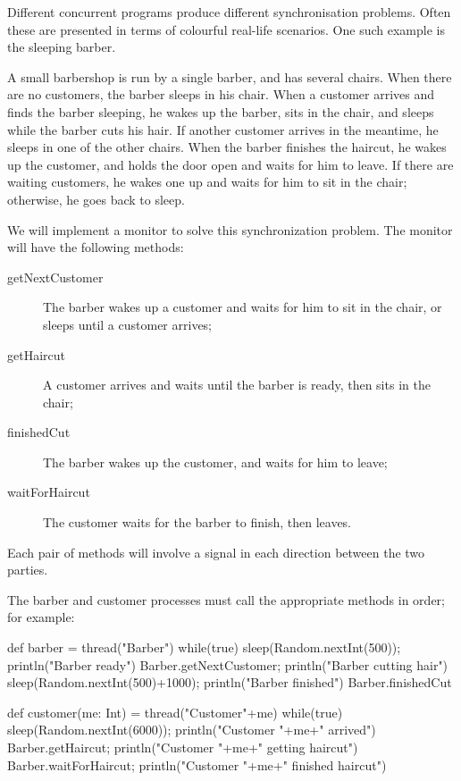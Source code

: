
\begin{slide}

Different concurrent programs produce different synchronisation problems.
Often these are presented in terms of colourful real-life scenarios.  One such
example is the sleeping barber.

A small barbershop is run by a single barber, and has several chairs.  When
there are no customers, the barber sleeps in his chair.  When a customer
arrives and finds the barber sleeping, he wakes up the barber, sits in the
chair, and sleeps while the barber cuts his hair.  If another customer arrives
in the meantime, he sleeps in one of the other chairs.  When the barber
finishes the haircut, he wakes up the customer, and holds the door open and
waits for him to leave.  If there are waiting customers, he wakes one up and
waits for him to sit in the chair; otherwise, he goes back to sleep.
\end{slide}


\begin{slide}

We will implement a monitor to solve this synchronization problem.  The
monitor will have the following methods:
%
\begin{description}
\item[getNextCustomer]
The barber wakes up a customer and waits for him to sit in the chair, or
sleeps until a customer arrives;

\item[getHaircut]
A customer arrives and waits until the barber is ready, then sits in the
chair;

\item[finishedCut]
The barber wakes up the customer, and waits for him to leave;

\item[waitForHaircut]
The customer waits for the barber to finish, then leaves.
\end{description}
%
Each pair of methods will involve a signal in each direction between the two
parties.
\end{slide}

\begin{slide}

The barber and customer processes must call the appropriate methods in order;
for example:
%
\begin{scala}
  def barber = thread("Barber"){
    while(true){
      sleep(Random.nextInt(500)); println("Barber ready")
      Barber.getNextCustomer; println("Barber cutting hair")
      sleep(Random.nextInt(500)+1000); println("Barber finished")
      Barber.finishedCut
  } }

  def customer(me: Int) = thread("Customer"+me){
    while(true){
      sleep(Random.nextInt(6000)); println("Customer "+me+" arrived")
      Barber.getHaircut; println("Customer "+me+" getting haircut")
      Barber.waitForHaircut; println("Customer "+me+" finished haircut")
  } }
\end{scala}
\end{slide}

